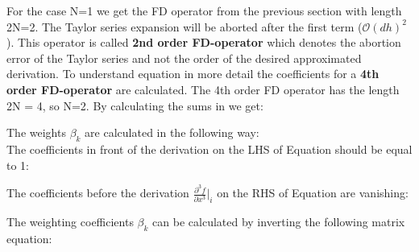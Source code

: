 \documentclass{hitec}
\begin{document}
For the case N=1 we get the FD operator from the previous section with length 2N=2. The Taylor series expansion will be aborted after the first  term (${\mathcal{O}}(dh)^{2}$). This operator is called {\bf{2nd order FD-operator}} which denotes the abortion error of the Taylor series and not the order of the desired approximated derivation. To understand equation  in more detail the coefficients for a {\bf{4th order FD-operator}} are calculated. The 4th order FD operator has the length 2N = 4, so N=2. By calculating the sums in  we get:


The weights $\beta_k$ are calculated in the following way:\\ 
The coefficients in front of the derivation on the LHS of Equation  should be equal to 1:


The coefficients before the derivation $\frac{\partial^3 f}{\partial x^3}\biggr|_i$ on the RHS of Equation  are vanishing:


The weighting coefficients $\beta_k$ can be calculated by inverting the following matrix equation:

\end{document}
